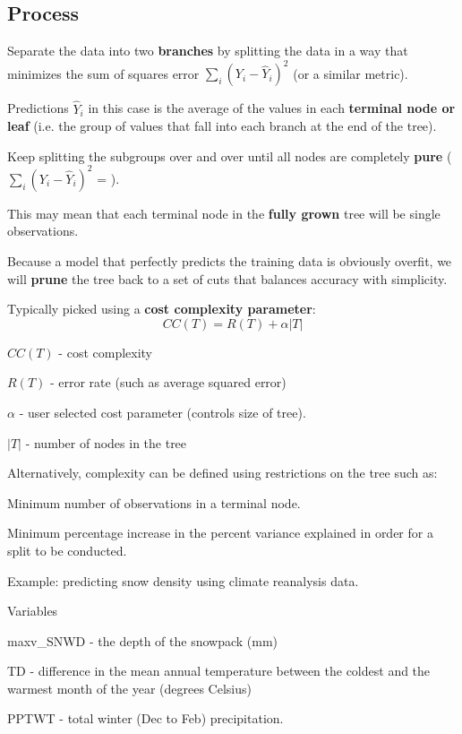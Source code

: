 \documentclass[12pt]{notes}
\begin{document}
\subsection{Process}
\bi
\item Separate the data into two \textbf{branches} by splitting the data in a way that minimizes the sum of squares error $\sum_i\left(Y_i - \hat{Y}_i\right)^2$ (or a similar metric). 
\bi
\item Predictions $\hat{Y}_i$ in this case is the average of the values in each \textbf{terminal node or leaf} (i.e. the group of values that fall into each branch at the end of the tree).  
\ei
\item Keep splitting the subgroups over and over until all nodes are completely \textbf{pure} ($\sum_i\left(Y_i - \hat{Y}_i\right)^2$ = ). 
\bi
\item This may mean that each terminal node in the \textbf{fully grown} tree will be single observations. 
\ei
\item Because a model that perfectly predicts the training data is obviously overfit, we will \textbf{prune} the tree back to a set of cuts that balances accuracy with simplicity. 
\bi
\item Typically picked using a \textbf{cost complexity parameter}:
$$CC(T) = R(T) + \alpha|T|$$
\bi
\item $CC(T)$ - cost complexity
\item $R(T)$ - error rate (such as average squared error)
\item $\alpha$ - user selected cost parameter (controls size of tree). 
\item $|T|$ - number of nodes in the tree
\ei
\item Alternatively, complexity can be defined using restrictions on the tree such as:
\bi
\item Minimum number of observations in a terminal node. 
\item Minimum percentage increase in the percent variance explained in order for a split to be conducted. 
\ei
\ei
\ei

Example: predicting snow density using climate reanalysis data. 

Variables
\bi
\item maxv\_SNWD - the depth of the snowpack (mm)
\item TD - difference in the mean annual temperature between the coldest and the warmest month of the year (degrees Celsius)
\item PPTWT - total winter (Dec to Feb) precipitation. 
\ei
\end{document}
